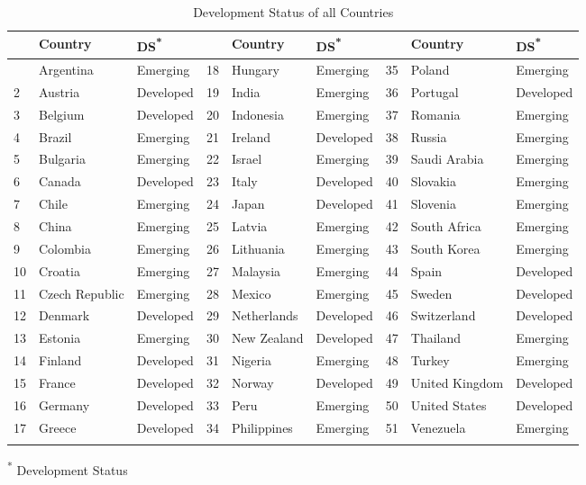 \begin{table}[t] \centering
{}

\caption{Development Status of all Countries}
\label{tab:app_emerging_advanced}
{\footnotesize
\begin{tabularx}{\linewidth}{l l l l l l l l l}

\toprule
{}&{Country}&{DS\textsuperscript{*}}&{}&{Country}&{DS\textsuperscript{*}}&{}&{Country}&{DS\textsuperscript{*}} \tabularnewline
\midrule \addlinespace[0pt]
\midrule 1&Argentina&Emerging&18&Hungary&Emerging&35&Poland&Emerging \tabularnewline
2&Austria&Developed&19&India&Emerging&36&Portugal&Developed \tabularnewline
3&Belgium&Developed&20&Indonesia&Emerging&37&Romania&Emerging \tabularnewline
4&Brazil&Emerging&21&Ireland&Developed&38&Russia&Emerging \tabularnewline
5&Bulgaria&Emerging&22&Israel&Emerging&39&Saudi Arabia&Emerging \tabularnewline
6&Canada&Developed&23&Italy&Developed&40&Slovakia&Emerging \tabularnewline
7&Chile&Emerging&24&Japan&Developed&41&Slovenia&Emerging \tabularnewline
8&China&Emerging&25&Latvia&Emerging&42&South Africa&Emerging \tabularnewline
9&Colombia&Emerging&26&Lithuania&Emerging&43&South Korea&Emerging \tabularnewline
10&Croatia&Emerging&27&Malaysia&Emerging&44&Spain&Developed \tabularnewline
11&Czech Republic&Emerging&28&Mexico&Emerging&45&Sweden&Developed \tabularnewline
12&Denmark&Developed&29&Netherlands&Developed&46&Switzerland&Developed \tabularnewline
13&Estonia&Emerging&30&New Zealand&Developed&47&Thailand&Emerging \tabularnewline
14&Finland&Developed&31&Nigeria&Emerging&48&Turkey&Emerging \tabularnewline
15&France&Developed&32&Norway&Developed&49&United Kingdom&Developed \tabularnewline
16&Germany&Developed&33&Peru&Emerging&50&United States&Developed \tabularnewline
17&Greece&Developed&34&Philippines&Emerging&51&Venezuela&Emerging \tabularnewline
\bottomrule \addlinespace[\belowrulesep]

\end{tabularx}
\begin{flushleft}
\footnotesize \begin{minipage}{1\textwidth} \vspace{-10pt} \begin{tabnote} \textsuperscript{*} Development Status \end{tabnote} \end{minipage}  
\end{flushleft}
}
\end{table}
